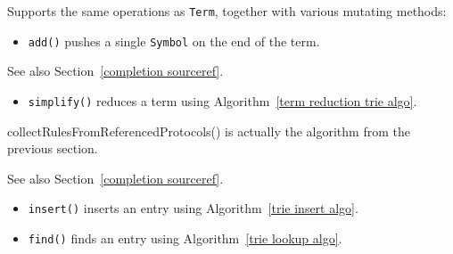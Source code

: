 \documentclass[../generics]{subfiles}
\begin{document}
Supports the same operations as \texttt{Term}, together with various mutating methods:
\begin{itemize}
\item \texttt{add()} pushes a single \texttt{Symbol} on the end of the term.
\end{itemize}



See also Section~\ref{completion sourceref}.

\begin{itemize}
\item \texttt{simplify()} reduces a term using Algorithm~\ref{term reduction trie algo}.
\end{itemize}


collectRulesFromReferencedProtocols() is actually the algorithm from the previous section.


See also Section~\ref{completion sourceref}.
\begin{itemize}
\item \texttt{insert()} inserts an entry using Algorithm~\ref{trie insert algo}.
\item \texttt{find()} finds an entry using Algorithm~\ref{trie lookup algo}.
\end{itemize}
\end{document}

